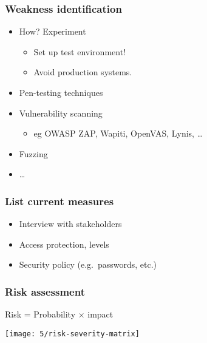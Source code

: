 \documentclass[aspectratio=169]{beamer}
\begin{document}
\begin{frame}
  \frametitle{Weakness identification}

  \begin{itemize}
    \item How? Experiment
          \begin{itemize}
            \item Set up test environment!
            \item Avoid production systems.
          \end{itemize}
    \item Pen-testing techniques
    \item Vulnerability scanning
          \begin{itemize}
            \item eg OWASP ZAP, Wapiti, OpenVAS, Lynis, \ldots
          \end{itemize}
    \item Fuzzing
    \item \ldots
  \end{itemize}

\end{frame}

\begin{frame}
  \frametitle{List current measures}
  \begin{itemize}
    \item Interview with stakeholders
    \item Access protection, levels
    \item Security policy (e.g.\ passwords, etc.)
  \end{itemize}

\end{frame}

\begin{frame}
  \frametitle{Risk assessment}

  \centering

  Risk = Probability $\times$ impact

  \texttt{[image: 5/risk-severity-matrix]}

\end{frame}
\end{document}
